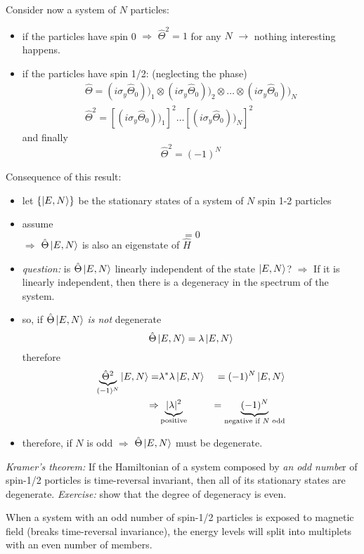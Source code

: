 \documentclass[12pt]{article}
\newcommand{\be}{\begin{equation}}
\newcommand{\ee}{\end{equation}}
\begin{document}
Consider now a system of $N$ particles:
\begin{itemize}
\item if the particles have spin 0 $\Rightarrow$ $\hat{\Theta}^2 = 1$ for any $N$ $\to$ 
nothing interesting happens.
\item if the particles have spin 1/2: (neglecting the phase)
\[
\begin{gathered}
\hat{\Theta} =
(i \sigma_y \hat{\Theta}_0))_1 \otimes
(i \sigma_y \hat{\Theta}_0))_2 \otimes
\ldots \otimes
(i \sigma_y \hat{\Theta}_0))_N\\
\hat{\Theta}^2 =
[(i \sigma_y \hat{\Theta}_0))_1]^2
\ldots
[(i \sigma_y \hat{\Theta}_0))_N]^2
\end{gathered}
\]
and finally
\be
\boxed{\hat{\Theta}^2 = (-1)^N}
\ee
\end{itemize}
Consequence of this result:
\begin{itemize}
\item let $\{\ket{E,N}\}$ be the stationary states of a
system of $N$ spin 1-2 particles
%
\item assume
\be
[\hat{\Theta},\hat{H}] = 0
\ee
$\Rightarrow$ $\hat{\Theta}\ket{E,N}$ is also an eigenstate of $\hat{H}$
%
\item \emph{question:} is $\hat{\Theta}\ket{E,N}$ linearly independent of
the state $\ket{E,N}$? $\Rightarrow$
If it is linearly independent, then
there is a degeneracy in the spectrum
of the system.
\item so, if $\hat{\Theta}\ket{E,N}$ \emph{is not} degenerate
\be
\hat{\Theta}\ket{E,N} = \lambda\ket{E,N}
\ee
therefore
\be
\begin{aligned}
\underbrace{\hat{\Theta}^2}_{(-1)^N}\ket{E,N} = &\lambda^*\lambda \ket{E,N} &= (-1)^N\ket{E,N}\\
\Rightarrow & \underbrace{|\lambda|^2}_{\text{positive}} &= \underbrace{(-1)^N}_{\text{negative if $N$ odd}}
\end{aligned}
\ee
\item therefore, if $N$ is odd $\Rightarrow$ $\hat{\Theta}\ket{E,N}$ must be degenerate.
\end{itemize}

\emph{Kramer's theorem:} If the Hamiltonian of a system composed
by \emph{an odd numbe}r of spin-1/2 porticles
is time-reversal invariant, then all of its
stationary states are degenerate.
\emph{Exercise:} show that the degree of degeneracy is even.

When a system with an odd number of spin-1/2
particles is exposed to magnetic field (breaks
time-reversal invariance), the energy levels will split
into multiplets with an even number of members.
\end{document}
